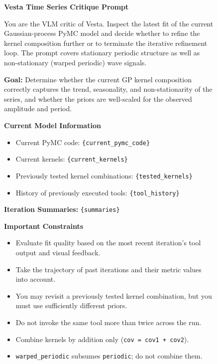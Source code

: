 \documentclass{article}
\newcommand{\method}{{\sc Vesta}}
\begin{document}
\begin{figure}[h]
\small
\begin{mdframed}[linecolor=gray!50, backgroundcolor=gray!5, linewidth=0.8pt]

\textbf{\method{} Time Series Critique Prompt}

\medskip
You are the VLM critic of \method{}. Inspect the latest fit of the current
Gaussian-process PyMC model and decide whether to refine the kernel
composition further or to terminate the iterative refinement loop. The
prompt covers stationary periodic structure as well as non-stationary
(warped periodic) wave signals.

\medskip
\textbf{Goal:} Determine whether the current GP kernel composition
correctly captures the trend, seasonality, and non-stationarity of the
series, and whether the priors are well-scaled for the observed amplitude
and period.

\medskip
\textbf{Current Model Information}
\begin{itemize}[leftmargin=*, nosep]
    \item Current PyMC code: \texttt{\{current\_pymc\_code\}}
    \item Current kernels: \texttt{\{current\_kernels\}}
    \item Previously tested kernel combinations: \texttt{\{tested\_kernels\}}
    \item History of previously executed tools: \texttt{\{tool\_history\}}
\end{itemize}

\medskip
\textbf{Iteration Summaries:} \texttt{\{summaries\}}

\medskip
\textbf{Important Constraints}
\begin{itemize}[leftmargin=*, nosep]
    \item Evaluate fit quality based on the most recent iteration's tool
          output and visual feedback.
    \item Take the trajectory of past iterations and their metric values
          into account.
    \item You may revisit a previously tested kernel combination, but you
          must use sufficiently different priors.
    \item Do not invoke the same tool more than twice across the run.
    \item Combine kernels by addition only (\texttt{cov = cov1 + cov2}).
    \item \texttt{warped\_periodic} subsumes \texttt{periodic}; do not
          combine them.
\end{itemize}


\end{mdframed}
\end{figure}
\end{document}
